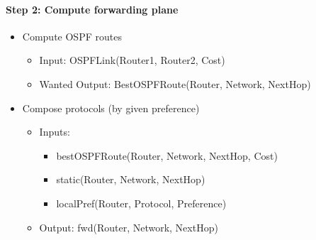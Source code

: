 \paragraph{Step 2: Compute forwarding plane}
\begin{itemize}
    \item Compute OSPF routes
    \begin{itemize}
    \item Input: OSPFLink(Router1, Router2, Cost)
    \item Wanted Output: BestOSPFRoute(Router, Network, NextHop)\newline
    \begin{minipage}{\linewidth}
    \centering      
    \def\svgwidth{\linewidth}
        
\end{minipage}
\end{itemize}
    \item Compose protocols (by given preference)
    \begin{itemize}
        \item Inputs: 
        \begin{itemize}
            \item bestOSPFRoute(Router, Network, NextHop, Cost)
            \item static(Router, Network, NextHop)
            \item localPref(Router, Protocol, Preference)
        \end{itemize}
        \item Output: fwd(Router, Network, NextHop)\newline
        \begin{minipage}{\linewidth}
        \centering      
        \def\svgwidth{\linewidth}
        
           
        \end{minipage}
    \end{itemize}
\end{itemize}
